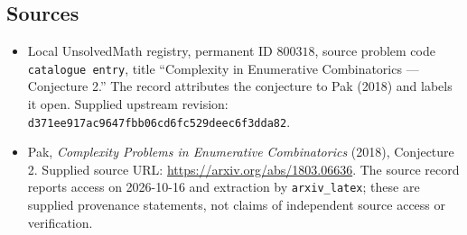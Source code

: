 \documentclass[11pt]{article}
\begin{document}
\subsection{Sources}
\begin{itemize}
\item Local UnsolvedMath registry, permanent ID \(800318\), source problem code \texttt{catalogue entry}, title ``Complexity in Enumerative Combinatorics --- Conjecture 2.'' The record attributes the conjecture to Pak (2018) and labels it open. Supplied upstream revision: \texttt{d371ee917ac9647fbb06cd6fc529deec6f3dda82}.
\item Pak, \emph{Complexity Problems in Enumerative Combinatorics} (2018), Conjecture 2. Supplied source URL: \url{https://arxiv.org/abs/1803.06636}. The source record reports access on 2026-10-16 and extraction by \texttt{arxiv\_latex}; these are supplied provenance statements, not claims of independent source access or verification.
\end{itemize}
\end{document}
